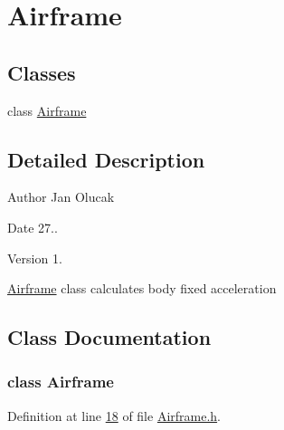 \hypertarget{group___airframe}{}\section{Airframe}
\label{group___airframe}
\subsection*{Classes}
\begin{DoxyCompactItemize}
\item 
class \hyperlink{group___airframe_class_airframe}{Airframe}
\end{DoxyCompactItemize}


\subsection{Detailed Description}
\begin{DoxyAuthor}{Author}
Jan Olucak 
\end{DoxyAuthor}
\begin{DoxyDate}{Date}
27.. 
\end{DoxyDate}
\begin{DoxyVersion}{Version}
1.
\end{DoxyVersion}
\hyperlink{group___airframe_class_airframe}{Airframe} class calculates body fixed acceleration 

\subsection{Class Documentation}
\label{class_airframe}
\subsubsection{class Airframe}


Definition at line \hyperlink{_airframe_8h_source_l00018}{18} of file \hyperlink{_airframe_8h_source}{Airframe.\+h}.

